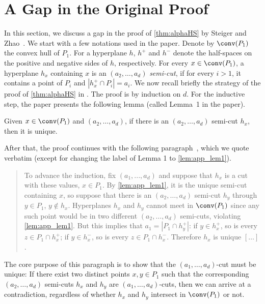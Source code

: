 \section{A Gap in the Original Proof}
\label{app:gap}
In this section, we discuss a gap in the proof of \cref{thm:alphaHS} by Steiger and Zhao~\cite{steigerGeneralizedHamSandwichCuts2010}.
We start with a few notations used in the paper.
Denote by $\conv(P_1)$ the convex hull of $P_1$.
For a hyperplane $h$, $h^+$ and $h^-$ denote the half-spaces on the positive and negative sides of $h$, respectively.
For every $x \in \conv(P_1)$, 
a hyperplane $h_x$ containing $x$ is an $(a_2, \dots, a_d)$ \emph{semi-cut}, if for every $i > 1$, it contains a point of $P_i$ and $|h^+_x \cap P_i| = a_i$.
%
We now recall briefly the strategy of the proof of \cref{thm:alphaHS} in \cite{steigerGeneralizedHamSandwichCuts2010}.
The proof is by induction on $d$.
For the inductive step, the paper presents the following lemma (called Lemma~1 in the paper).
%
\begin{longlemma}
\label{lem:app_lem1}
Given $x \in \conv(P_1)$ and $(a_2, \dots , a_d)$, if there is an $(a_2, \dots , a_d)$ semi-cut
$h_x$, then it is unique.
\end{longlemma}
%
After that, the proof continues with the following paragraph~\cite[Page 539]{steigerGeneralizedHamSandwichCuts2010}, which we quote verbatim (except for changing the label of Lemma 1 to \cref{lem:app_lem1}).
%
\begin{quote}
    \small
    To advance the induction, fix $(a_1, . . . , a_d)$ and suppose that $h_x$ is a cut with these
values, $x \in P_1$. 
    By \cref{lem:app_lem1}, it is the unique semi-cut containing $x$, so suppose that there is an $(a_2, \dots , a_d)$ semi-cut $h_y$ through $y \in P_1$, $y \notin h_x$. Hyperplanes $h_x$ and $h_y$ cannot meet in $\conv(P_1)$ since any such point would be in two different $(a_2, \dots ,a_d)$ semi-cuts, violating \cref{lem:app_lem1}. But this implies that $a_1 = |P_1 \cap h^+_y|$: if $y \in h^+_x$, so is every $z \in P_1 \cap h^+_x$; if $y \in h^-_x$, so is every $z \in P_1 \cap h^-_x$. Therefore $h_x$ is unique $[\dots]$.
\end{quote}
%
The core purpose of this paragraph is to show that the $(a_1, \dots, a_d)$-cut must be unique:
If there exist two distinct points $x, y \in P_1$ such that the corresponding $(a_2, \dots , a_d)$ semi-cuts $h_x$ and $h_y$ are $(a_1, \dots, a_d)$-cuts, then we can arrive at a contradiction, regardless of whether $h_x$ and $h_y$ intersect in $\conv(P_1)$ or not.

